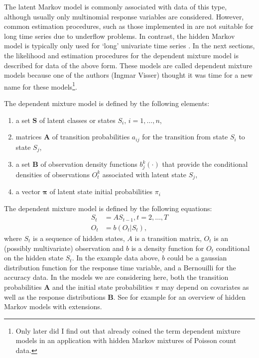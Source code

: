 \documentclass[article]{jss}
\newcommand{\vc}{\mathbf}
\newcommand{\mat}{\mathbf}
\begin{document}
The latent Markov model is commonly associated with data of this type,
although usually only multinomial response variables are considered.  However,
common estimation procedures, such as those implemented in
\citet{Pol1996} are not suitable for long time series due to underflow
problems.  In contrast, the hidden Markov model is typically only used
for `long' univariate time series 
\cite[see e.g.][, chapter~1 for an overview of examples]{Cappe2005}.  
In the next sections, the
likelihood and estimation procedures for the dependent mixture model is
described for data of the above form.  These models are called
dependent mixture models because one of the authors (Ingmar Visser)
thought it was time for a new name for these models\footnote{Only
later did I find out that \citet{Leroux1992} already coined the term
dependent mixture models in an application with hidden Markov mixtures
of Poisson count data.}.

The dependent mixture model is defined by the following elements:
\begin{enumerate}
	
	\item a set $\vc{S}$ of latent classes or states $S_{i},\, i=1,
	\ldots , n$,
	
	\item matrices $\mat{A}$ of transition probabilities $a_{ij}$ for
	the transition from state $S_{i}$ to state $S_{j}$,
	
	\item a set $\vc{B}$ of observation density functions $b_j^k(\cdot)$ that
	provide the conditional densities of observations $O_{t}^k$ 
	associated with latent state $S_{j}$,
	
	\item a vector $\pmb{\pi}$ of latent state initial probabilities
	$\pi_{i}$
\end{enumerate}

The dependent mixture model is defined by the following equations: 
\begin{align}
	S_{t} &= A S_{t-1}, t=2, \ldots, T \\
	O_{t} &= b(O_{t}|S_{t}), 
\end{align}
where $S_{t}$ is a sequence of hidden states, $A$ is a transition
matrix, $O_{t}$ is an (possibly multivariate) observation and $b$ is a
density function for $O_{t}$ conditional on the hidden state $S_{t}$.
In the example data above, $b$ could be a gaussian distribution
function for the response time variable, and a Bernouilli for the
accuracy data.  In the models we are considering here, both the
transition probabilities $\mat{A}$ and the initial state probabilities $\pi$
may depend on covariates as well as the response distributions $\vc{B}$. 
See for example \citet{Fruhwirth2006} for an overview of 
hidden Markov models with extensions. 
\end{document}
